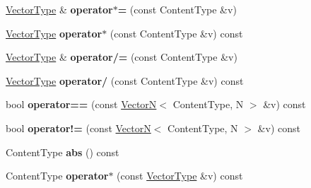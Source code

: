 \begin{DoxyCompactItemize}
\item 
\hypertarget{classsambag_1_1math_1_1_vector_n_a85ccf827fca0a13e9847f0d759a4f7bd}{
\hyperlink{classsambag_1_1math_1_1_vector_n}{VectorType} \& {\bfseries operator$\ast$=} (const ContentType \&v)}
\label{classsambag_1_1math_1_1_vector_n_a85ccf827fca0a13e9847f0d759a4f7bd}

\item 
\hypertarget{classsambag_1_1math_1_1_vector_n_a92e9c564a8ecbce2354ea51eb47c4e31}{
\hyperlink{classsambag_1_1math_1_1_vector_n}{VectorType} {\bfseries operator$\ast$} (const ContentType \&v) const }
\label{classsambag_1_1math_1_1_vector_n_a92e9c564a8ecbce2354ea51eb47c4e31}

\item 
\hypertarget{classsambag_1_1math_1_1_vector_n_a075396ad3ea6f94c47e8007b6621591a}{
\hyperlink{classsambag_1_1math_1_1_vector_n}{VectorType} \& {\bfseries operator/=} (const ContentType \&v)}
\label{classsambag_1_1math_1_1_vector_n_a075396ad3ea6f94c47e8007b6621591a}

\item 
\hypertarget{classsambag_1_1math_1_1_vector_n_a5f20b0bc594046bee0883e9828a53169}{
\hyperlink{classsambag_1_1math_1_1_vector_n}{VectorType} {\bfseries operator/} (const ContentType \&v) const }
\label{classsambag_1_1math_1_1_vector_n_a5f20b0bc594046bee0883e9828a53169}

\item 
\hypertarget{classsambag_1_1math_1_1_vector_n_a880e7e941e8bbc7fd18c2a664ebed5a4}{
bool {\bfseries operator==} (const \hyperlink{classsambag_1_1math_1_1_vector_n}{VectorN}$<$ ContentType, N $>$ \&v) const }
\label{classsambag_1_1math_1_1_vector_n_a880e7e941e8bbc7fd18c2a664ebed5a4}

\item 
\hypertarget{classsambag_1_1math_1_1_vector_n_a2f227f546ad830b0b5cdb7cd9d4e3bb0}{
bool {\bfseries operator!=} (const \hyperlink{classsambag_1_1math_1_1_vector_n}{VectorN}$<$ ContentType, N $>$ \&v) const }
\label{classsambag_1_1math_1_1_vector_n_a2f227f546ad830b0b5cdb7cd9d4e3bb0}

\item 
\hypertarget{classsambag_1_1math_1_1_vector_n_a1b23bcc487c9b8fa5a68419488946c1f}{
ContentType {\bfseries abs} () const }
\label{classsambag_1_1math_1_1_vector_n_a1b23bcc487c9b8fa5a68419488946c1f}

\item 
\hypertarget{classsambag_1_1math_1_1_vector_n_a6d1e3fb42e7f18c6f9982cf166a61f89}{
ContentType {\bfseries operator$\ast$} (const \hyperlink{classsambag_1_1math_1_1_vector_n}{VectorType} \&v) const }
\label{classsambag_1_1math_1_1_vector_n_a6d1e3fb42e7f18c6f9982cf166a61f89}

\end{DoxyCompactItemize}

